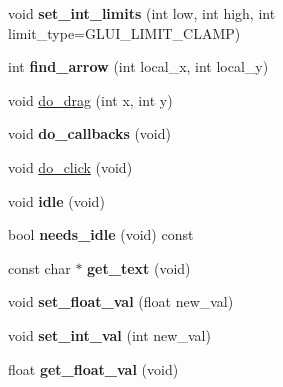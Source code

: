 \begin{DoxyCompactItemize}
\item 
\hypertarget{classGLUI__Spinner_aa1a2609687a9ed2c6ab71944f052ed61}{void {\bfseries set\-\_\-int\-\_\-limits} (int low, int high, int limit\-\_\-type=G\-L\-U\-I\-\_\-\-L\-I\-M\-I\-T\-\_\-\-C\-L\-A\-M\-P)}\label{classGLUI__Spinner_aa1a2609687a9ed2c6ab71944f052ed61}

\item 
\hypertarget{classGLUI__Spinner_a760982be4e98d61b02bc907d175b6ae2}{int {\bfseries find\-\_\-arrow} (int local\-\_\-x, int local\-\_\-y)}\label{classGLUI__Spinner_a760982be4e98d61b02bc907d175b6ae2}

\item 
void \hyperlink{classGLUI__Spinner_aa6286e3baade0e3f32942bbcfc551b8a}{do\-\_\-drag} (int x, int y)
\item 
\hypertarget{classGLUI__Spinner_af96a0ea91023049a11403386b9b561f0}{void {\bfseries do\-\_\-callbacks} (void)}\label{classGLUI__Spinner_af96a0ea91023049a11403386b9b561f0}

\item 
void \hyperlink{classGLUI__Spinner_aa06abe063d360ba9a92d192774a56cd1}{do\-\_\-click} (void)
\item 
\hypertarget{classGLUI__Spinner_a2c01dfece4f8c14ca6e9a27b89604306}{void {\bfseries idle} (void)}\label{classGLUI__Spinner_a2c01dfece4f8c14ca6e9a27b89604306}

\item 
\hypertarget{classGLUI__Spinner_a1cdc9aa83a2e2616f39bb6b9d4fc1846}{bool {\bfseries needs\-\_\-idle} (void) const }\label{classGLUI__Spinner_a1cdc9aa83a2e2616f39bb6b9d4fc1846}

\item 
\hypertarget{classGLUI__Spinner_a76a89020f67708a2400c6ab8de510e6a}{const char $\ast$ {\bfseries get\-\_\-text} (void)}\label{classGLUI__Spinner_a76a89020f67708a2400c6ab8de510e6a}

\item 
\hypertarget{classGLUI__Spinner_ada0d7ff186f994a1e66bd26bd857341a}{void {\bfseries set\-\_\-float\-\_\-val} (float new\-\_\-val)}\label{classGLUI__Spinner_ada0d7ff186f994a1e66bd26bd857341a}

\item 
\hypertarget{classGLUI__Spinner_a97e735a646eb5bd92528f3d814bc496c}{void {\bfseries set\-\_\-int\-\_\-val} (int new\-\_\-val)}\label{classGLUI__Spinner_a97e735a646eb5bd92528f3d814bc496c}

\item 
\hypertarget{classGLUI__Spinner_afe6b537d311690ccfaf1004a3d666f0a}{float {\bfseries get\-\_\-float\-\_\-val} (void)}\label{classGLUI__Spinner_afe6b537d311690ccfaf1004a3d666f0a}


\end{DoxyCompactItemize}
